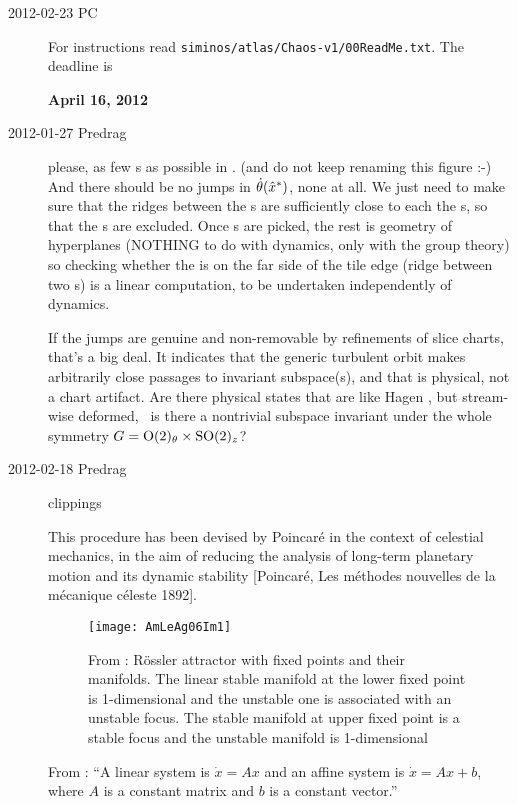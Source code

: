\begin{description}
\item[2012-02-23 PC] For instructions read
\texttt{siminos/atlas/Chaos-v1/00ReadMe.txt}. The deadline is

\textbf{April 16, 2012}

\item[2012-01-27 Predrag]
    please, as few \template s as possible in .
    (and do not keep renaming this figure :-) And there should be no
    jumps in $\dot{\theta}(\hat{x}^\ast)$, none at all. We just need to
    make sure that the ridges between the \template s are sufficiently
    close to each the \template s, so that the {\chartBord s} are excluded. Once
    \template s are picked, the rest is geometry of hyperplanes (NOTHING to
    do with dynamics, only with the group theory) so checking whether the
    {\chartBord} is on the far side of the tile edge (ridge
    between two \slice s) is a linear computation, to be undertaken
    independently of dynamics.

    If the jumps are genuine and non-removable by refinements of slice
    charts, that's a big deal. It indicates that the generic turbulent orbit
    makes arbitrarily close passages to invariant subspace(s), and that is
    physical, not a chart artifact. Are there physical states that are like
    Hagen \eqv, but stream-wise deformed, \ie\ is there a nontrivial subspace
    invariant under the whole symmetry $G = \textrm{O}(2)_\theta \times
    \textrm{SO}(2)_z$?

\item[2012-02-18 Predrag] clippings

This procedure has been devised by Poincar\'e in the context of celestial
mechanics, in the aim of reducing the analysis of long-term planetary
motion and its dynamic stability [Poincar\'e, Les m\'ethodes nouvelles de
la m\'ecanique c\'eleste 1892].

\begin{figure}
  \texttt{[image: AmLeAg06Im1]}\\
  \caption{From :
R\"ossler attractor with fixed points and their manifolds. The linear
stable manifold at the lower fixed point is 1-dimensional and the
unstable one is associated with an unstable focus. The stable manifold at
upper fixed point is a stable focus and the unstable manifold is
1-dimensional}
\label{fig:AmLeAg06Im1}
\end{figure}

From :
``A linear system is $\dot{x} =Ax$ and an affine system is $\dot{x}
=Ax+b$, where $A$ is a constant matrix and $b$ is a constant vector.''


\end{description}
